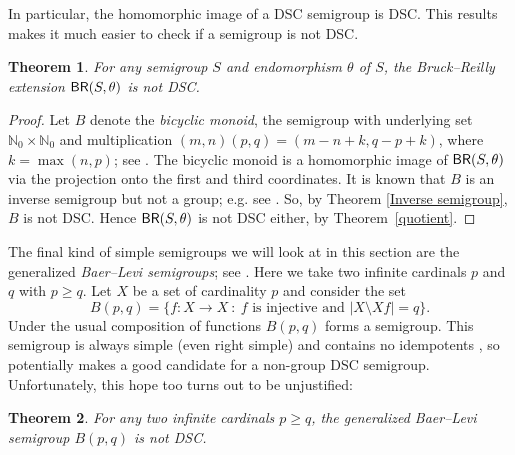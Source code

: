 \documentclass[a4paper, 12pt,reqno]{amsart}
\theoremstyle{plain}
\newtheorem{thm}{Theorem}[section]
\theoremstyle{definition}
\theoremstyle{remark}
\newcommand{\N}{\mathbb{N}}
\newcommand{\BR}{\textup{\textsf{BR}}}
\begin{document}
In particular, the homomorphic image of a DSC semigroup is DSC. This results makes it much easier to check if a semigroup is not DSC.

\begin{thm}\label{bruck-reilly}
    For any semigroup $S$ and endomorphism $\theta$ of $S$, the Bruck--Reilly extension $\BR(S,\theta)$ is not DSC.
\end{thm}



\begin{proof}
Let $B$ denote the \emph{bicyclic monoid}, the semigroup with underlying set $\N_0 \times \N_0$ and multiplication $(m,n)(p,q) = (m-n+k,q-p+k)$, where $k = \max(n,p)$; see \cite[Section 1.6]{Ho95}. 
    The bicyclic monoid is a homomorphic image of $\BR(S,\theta)$ via the projection onto the first and third coordinates.
    It is known that $B$ is an inverse semigroup but not a group; e.g. see \cite[Section 5.4]{Ho95}.
    So, by Theorem \ref{Inverse semigroup}, $B$ is not DSC.
    Hence $\BR(S,\theta)$ is not DSC either, by Theorem~\ref{quotient}.
\end{proof}

The final kind of simple semigroups we will look at in this section are the generalized \emph{Baer--Levi semigroups}; see \cite[Section 8.1]{CP67v2}. 
Here we take two infinite cardinals $p$ and $q$ with $p \geq q$. 
Let $X$ be a set of cardinality $p$ and consider the set 
\[
B(p,q) = \{ f\colon X \to X\: \colon\: f \text{ is injective and } | X \setminus Xf| = q \}.
\]
Under the usual composition of functions $B(p,q)$ forms a semigroup. 
This semigroup is always  simple (even right simple) and contains no idempotents \cite[Theorem 8.2]{CP67v2}, so potentially makes a good candidate for a non-group DSC semigroup. 
Unfortunately, this hope too turns out to be unjustified:

\begin{thm}\label{Baer Levi}
    For any two infinite cardinals $p \geq q$, the generalized Baer--Levi semigroup $B(p,q)$ is not DSC.
\end{thm}
\end{document}
